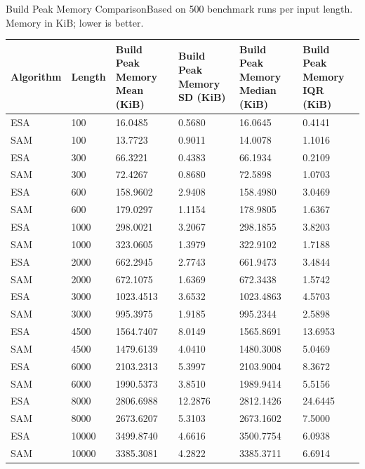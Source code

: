 \begin{benchmarktable}{Build Peak Memory Comparison}{Based on 500 benchmark runs per input length. Memory in KiB; lower is better.}
\begin{tabularx}{\textwidth}{|X|X|X|X|X|X|}
\toprule
Algorithm & Length & Build Peak Memory Mean (KiB) & Build Peak Memory SD (KiB) & Build Peak Memory Median (KiB) & Build Peak Memory IQR (KiB) \\
\midrule
ESA & 100 & 16.0485 & 0.5680 & 16.0645 & 0.4141 \\
SAM & 100 & 13.7723 & 0.9011 & 14.0078 & 1.1016 \\
\hline
ESA & 300 & 66.3221 & 0.4383 & 66.1934 & 0.2109 \\
SAM & 300 & 72.4267 & 0.8680 & 72.5898 & 1.0703 \\
\hline
ESA & 600 & 158.9602 & 2.9408 & 158.4980 & 3.0469 \\
SAM & 600 & 179.0297 & 1.1154 & 178.9805 & 1.6367 \\
\hline
ESA & 1000 & 298.0021 & 3.2067 & 298.1855 & 3.8203 \\
SAM & 1000 & 323.0605 & 1.3979 & 322.9102 & 1.7188 \\
\hline
ESA & 2000 & 662.2945 & 2.7743 & 661.9473 & 3.4844 \\
SAM & 2000 & 672.1075 & 1.6369 & 672.3438 & 1.5742 \\
\hline
ESA & 3000 & 1023.4513 & 3.6532 & 1023.4863 & 4.5703 \\
SAM & 3000 & 995.3975 & 1.9185 & 995.2344 & 2.5898 \\
\hline
ESA & 4500 & 1564.7407 & 8.0149 & 1565.8691 & 13.6953 \\
SAM & 4500 & 1479.6139 & 4.0410 & 1480.3008 & 5.0469 \\
\hline
ESA & 6000 & 2103.2313 & 5.3997 & 2103.9004 & 8.3672 \\
SAM & 6000 & 1990.5373 & 3.8510 & 1989.9414 & 5.5156 \\
\hline
ESA & 8000 & 2806.6988 & 12.2876 & 2812.1426 & 24.6445 \\
SAM & 8000 & 2673.6207 & 5.3103 & 2673.1602 & 7.5000 \\
\hline
ESA & 10000 & 3499.8740 & 4.6616 & 3500.7754 & 6.0938 \\
SAM & 10000 & 3385.3081 & 4.2822 & 3385.3711 & 6.6914 \\
\bottomrule
\end{tabularx}
\end{benchmarktable}

